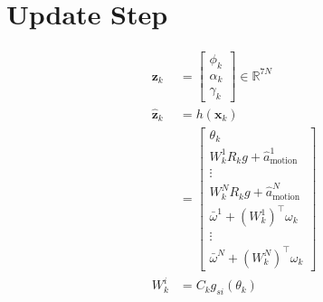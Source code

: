 \documentclass[11pt]{article}
\begin{document}
\section{Update Step}
\begin{align*}
    \mathbf{z}_k &= \begin{bmatrix}
        \phi_k \\ \alpha_k \\ \gamma_k
    \end{bmatrix} \in \mathbb{R}^{7N} \\
    \hat{\mathbf{z}}_k &= h(\mathbf{x}_k) \\
    &= \begin{bmatrix}
        \theta_k \\
        W_k^1 R_k g + \hat{a}^1_{\text{motion}} \\
        \vdots \\
        W_k^N R_k g + \hat{a}^N_{\text{motion}} \\
        \bar{\omega}^1 + (W_k^1)^\top \omega_k \\
        \vdots \\
        \bar{\omega}^N + (W_k^N)^\top \omega_k
    \end{bmatrix} \\
    W_k^i &= C_k g_{si}(\theta_k)
\end{align*}
\end{document}
